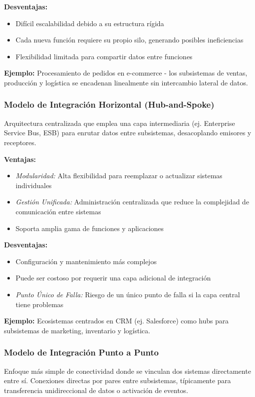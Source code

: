 \documentclass[12pt]{book}
\begin{document}
\textbf{Desventajas:}
\begin{itemize}
\item Difícil escalabilidad debido a su estructura rígida
\item Cada nueva función requiere su propio silo, generando posibles ineficiencias
\item Flexibilidad limitada para compartir datos entre funciones
\end{itemize}

\textbf{Ejemplo:} Procesamiento de pedidos en e-commerce - los subsistemas de ventas, producción y logística se encadenan linealmente sin intercambio lateral de datos.

\subsubsection{Modelo de Integración Horizontal (Hub-and-Spoke)}
Arquitectura centralizada que emplea una capa intermediaria (ej. Enterprise Service Bus, ESB) para enrutar datos entre subsistemas, desacoplando emisores y receptores.

\textbf{Ventajas:}
\begin{itemize}
\item \textit{Modularidad:} Alta flexibilidad para reemplazar o actualizar sistemas individuales
\item \textit{Gestión Unificada:} Administración centralizada que reduce la complejidad de comunicación entre sistemas
\item Soporta amplia gama de funciones y aplicaciones
\end{itemize}

\textbf{Desventajas:}
\begin{itemize}
\item Configuración y mantenimiento más complejos
\item Puede ser costoso por requerir una capa adicional de integración
\item \textit{Punto Único de Falla:} Riesgo de un único punto de falla si la capa central tiene problemas
\end{itemize}

\textbf{Ejemplo:} Ecosistemas centrados en CRM (ej. Salesforce) como hubs para subsistemas de marketing, inventario y logística.

\subsubsection{Modelo de Integración Punto a Punto}
Enfoque más simple de conectividad donde se vinculan dos sistemas directamente entre sí. Conexiones directas por pares entre subsistemas, típicamente para transferencia unidireccional de datos o activación de eventos.
\end{document}
